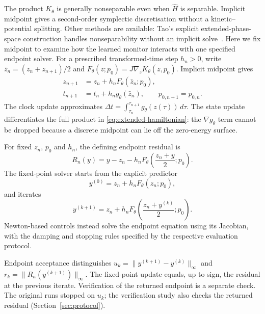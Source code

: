 \documentclass[final,3p,times]{elsarticle}
\begin{document}
The product $K_\theta$ is generally nonseparable even when $\widehat H$
is separable. Implicit midpoint gives a second-order symplectic
discretisation without a kinetic--potential splitting. Other methods
are available: Tao's explicit extended-phase-space construction handles
nonseparability without an implicit solve~\cite{Tao2016}. Here we fix
midpoint to examine how the learned monitor interacts with one specified
endpoint solver.
For a prescribed transformed-time step $h_n>0$, write
$\bar z_n=(z_n+z_{n+1})/2$ and
$F_\theta(z;p_0)=J\nabla_z K_\theta(z,p_0)$. Implicit midpoint gives
\begin{align}
 z_{n+1}&=z_n+h_n F_\theta(\bar z_n;p_0),
 \label{eq:midpoint-state}\\
 t_{n+1}&=t_n+h_n g_\theta(\bar z_n),\qquad p_{0,n+1}=p_{0,n}.
 \label{eq:midpoint-clock}
\end{align}
The clock update approximates
$\Delta t=\int_{\tau_n}^{\tau_{n+1}}g_\theta(z(\tau))\,d\tau$.
The state update differentiates the full product in
\eqref{eq:extended-hamiltonian}: the $\nabla g_\theta$ term cannot be
dropped because a discrete midpoint can lie off the zero-energy surface.

For fixed $z_n$, $p_0$ and $h_n$, the defining endpoint residual is
\begin{equation}
 R_n(y)=y-z_n-h_n F_\theta\!\left(\frac{z_n+y}{2};p_0\right).
 \label{eq:endpoint-residual}
\end{equation}
The fixed-point solver starts from the explicit predictor
\begin{equation}
 y^{(0)}=z_n+h_n F_\theta(z_n;p_0),
 \label{eq:explicit-predictor}
\end{equation}
and iterates
\begin{equation}
 y^{(k+1)}=z_n+h_n F_\theta\!\left(\frac{z_n+y^{(k)}}{2};p_0\right).
 \label{eq:fixed-point-iteration}
\end{equation}
Newton-based controls instead solve the endpoint equation using its
Jacobian, with the damping and stopping rules specified by the respective
evaluation protocol.

Endpoint acceptance distinguishes
$u_k=\|y^{(k+1)}-y^{(k)}\|_\infty$ and
$r_k=\|R_n(y^{(k+1)})\|_\infty$. The fixed-point update equals, up to sign, the residual
at the previous iterate. Verification of the returned endpoint is a
separate check. The original runs stopped on $u_k$; the verification
study also checks the returned residual (Section~\ref{sec:protocol}).
\end{document}
